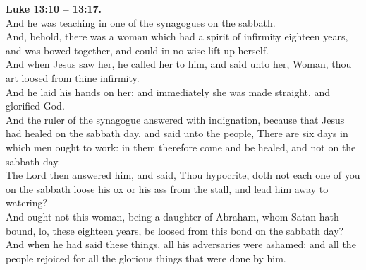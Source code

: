 \documentclass[10pt]{article} %
\begin{document}
{\begin{minipage}[t]{0.45\textwidth}
\textbf{Luke 13:10 -- 13:17.}\\
And he was teaching in one of the synagogues on the sabbath.\\
And, behold, there was a woman which had a spirit of infirmity eighteen years, and was bowed together, and could in no wise lift up herself.\\
And when Jesus saw her, he called her to him, and said unto her, Woman, thou art loosed from thine infirmity.\\
And he laid his hands on her: and immediately she was made straight, and glorified God.\\
And the ruler of the synagogue answered with indignation, because that Jesus had healed on the sabbath day, and said unto the people, There are six days in which men ought to work: in them therefore come and be healed, and not on the sabbath day.\\
The Lord then answered him, and said, Thou hypocrite, doth not each one of you on the sabbath loose his ox or his ass from the stall, and lead him away to watering?\\
And ought not this woman, being a daughter of Abraham, whom Satan hath bound, lo, these eighteen years, be loosed from this bond on the sabbath day?\\
And when he had said these things, all his adversaries were ashamed: and all the people rejoiced for all the glorious things that were done by him.\\
\end{minipage}}
\newpage\huge
\doublespacing %
\end{document}
